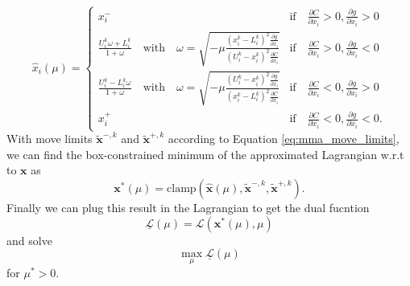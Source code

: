 \begin{equation}
    \hat{x}_i (\mu) = 
    \begin{cases}
        x^-_i 
            &\textrm{if} \quad \frac{\partial C}{\partial x_i} > 0, \frac{\partial g}{\partial x_i} > 0 \\
        \frac{U_i^k\omega + L_i^k}{1+\omega} \quad \text{with} \quad \omega = \sqrt{-\mu\frac{(x_i^k-L_i^k)^2\frac{\partial g}{\partial x_i}}{(U_i^k-x_i^k)^2\frac{\partial C}{\partial x_i}}}
            &\textrm{if} \quad \frac{\partial C}{\partial x_i}  > 0, \frac{\partial g}{\partial x_i} <0\\
        \frac{U_i^k-L_i^k\omega}{1+\omega} \quad \text{with} \quad \omega = \sqrt{-\mu\frac{(U_i^k-x_i^k)^2\frac{\partial g}{\partial x_i}}{(x_i^k-L_i^k)^2\frac{\partial C}{\partial x_i}}} 
            &\textrm{if} \quad \frac{\partial C}{\partial x_i} < 0, \frac{\partial g}{\partial x_i}  > 0\\
        x^+_i 
            &\textrm{if} \quad \frac{\partial C}{\partial x_i}< 0, \frac{\partial g}{\partial x_i} < 0.
    \end{cases}
\end{equation}
With move limits $\tilde{\mathbf{x}}^{-,k}$ and $\tilde{\mathbf{x}}^{+,k}$ according to Equation \eqref{eq:mma_move_limits}, we can find the box-constrained minimum of the approximated Lagrangian w.r.t to $\mathbf{x}$ as
\begin{equation}
    \mathbf{x}^*(\mu) = \textrm{clamp}\left(\hat{\mathbf{x}}(\mu), \tilde{\mathbf{x}}^{-,k}, \tilde{\mathbf{x}}^{+,k} \right).
\end{equation}
Finally we can plug this result in the Lagrangian to get the dual fucntion 
\begin{equation}
    \underline{\mathcal{L}}(\mu) = \mathcal{L}(\mathbf{x}^* (\mu), \mu)
\end{equation}
and solve 
\begin{equation}
    \max_{\mu} \underline{\mathcal{L}}(\mu)
    \label{eq:shape_dual_solution}
\end{equation}
for $\mu^*>0$. 

